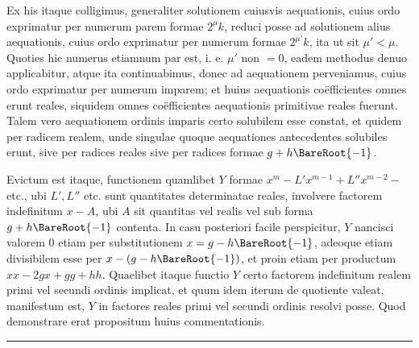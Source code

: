 Ex his itaque colligimus, generaliter solutionem cuiusvis aequationis, cuius
ordo exprimatur per numerum parem formae $2^\mu k$, reduci posse ad solutionem
alius aequationis, cuius ordo exprimatur per numerum formae $2^{\mu'}k$, ita ut sit
$\mu'<\mu$. Quoties hic numerus etiamnum par est, i. e. $\mu'$ non $=0$, eadem methodus denuo applicabitur, atque ita continuabimus, donec ad aequationem perveniamus, cuius ordo exprimatur per numerum imparem; et huius aequationis
coëfficientes omnes erunt reales, siquidem omnes coëfficientes aequationis primitivae reales fuerunt. Talem vero aequationem ordinis imparis certo solubilem esse
constat, et quidem per radicem realem, unde singulae quoque aequationes antecedentes solubiles erunt, sive per radices reales sive per radices formae $g+h\BareRoot{-1}$.

Evictum est itaque, functionem quamlibet $Y$ formae $x^m-L'x^{m-1}+L''x^{m-2}-$
etc., ubi $L',L''$ etc. sunt quantitates determinatae reales, involvere factorem indefinitum $x-A$, ubi $A$ sit quantitas vel realis vel sub forma $g+h\BareRoot{-1}$ contenta. In casu posteriori facile perspicitur, $Y$ nancisci valorem 0 etiam per substitutionem $x=g-h\BareRoot{-1}$, adeoque etiam divisibilem esse per $x-(g-h\BareRoot{-1})$,
et proin etiam per productum $xx-2gx+gg+hh$. Quaelibet itaque functio
$Y$ certo factorem indefinitum realem primi vel secundi ordinis implicat, et quum
idem iterum de quotiente valeat, manifestum est, $Y$ in factores reales primi vel
secundi ordinis resolvi posse. Quod demonstrare erat propositum huius commentationis.
\begin{center}\rule{3cm}{0.3pt}\end{center}
